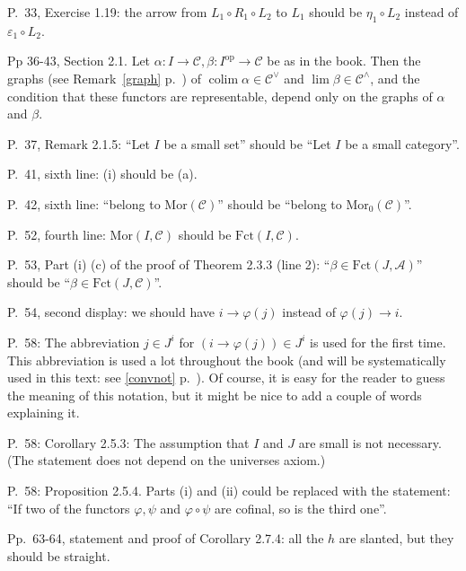 \documentclass[12pt]{article}
\theoremstyle{remark}
\theoremstyle{definition}
\newcommand{\n}{\noindent}
\newcommand{\A}{\mathcal A}
\newcommand{\C}{\mathcal C}
\DeclareMathOperator*{\coli}{colim}
\DeclareMathOperator{\h}{Hom}
\DeclareMathOperator{\op}{op}
\begin{document}
\n P.~33, Exercise 1.19: the arrow from $L_1\circ R_1\circ L_2$ to $L_1$ should be $\eta_1\circ L_2$ instead of $\varepsilon_1\circ L_2$. 

\n Pp 36-43, Section 2.1. Let $\alpha:I\to\C,\beta:I^{\op}\to\C$ be as in the book. Then the graphs (see Remark~\ref{graph} p.~\pageref{graph}) of $\coli\alpha\in\C^\vee$ and $\lim\beta\in\C^\wedge$, and the condition that these functors are representable, depend only on the graphs of $\alpha$ and $\beta$. 

\n P.~37, Remark 2.1.5: ``Let $I$ be a small set'' should be ``Let $I$ be a small category''.  

\n P.~41, sixth line: (i) should be (a). 

\n P.~42, sixth line: ``belong to $\text{Mor}(\C)$'' should be ``belong to $\text{Mor}_0(\C)$''.

\n P.~52, fourth line: $\text{Mor}(I,\C)$ should be $\text{Fct}(I,\C)$. 

\n P.~53, Part (i) (c) of the proof of Theorem 2.3.3 (line 2): ``$\beta\in\text{Fct}(J,\A)$'' should be ``$\beta\in\text{Fct}(J,\C)$''.

\n P.~54, second display: we should have $i\to\varphi(j)$ instead of $\varphi(j)\to i$. 


\n P.~58: The abbreviation $j\in J^i$ for $(i\to\varphi(j))\in J^i$ is used for the first time. This abbreviation is used a lot throughout the book (and will be systematically used in this text: see \eqref{convnot} p.~\pageref{convnot}). Of course, it is easy for the reader to guess the meaning of this notation, but it might be nice to add a couple of words explaining it. 

\n P.~58: Corollary 2.5.3: The assumption that $I$ and $J$ are small is not necessary. (The statement does not depend on the universes axiom.) 

\n P.~58: Proposition 2.5.4. Parts (i) and (ii) could be replaced with the statement: ``If two of the functors $\varphi,\psi$ and $\varphi\circ\psi$ are cofinal, so is the third one''.

\n Pp.~63-64, statement and proof of Corollary 2.7.4: all the $h$ are slanted, but they should be straight.
\end{document}
